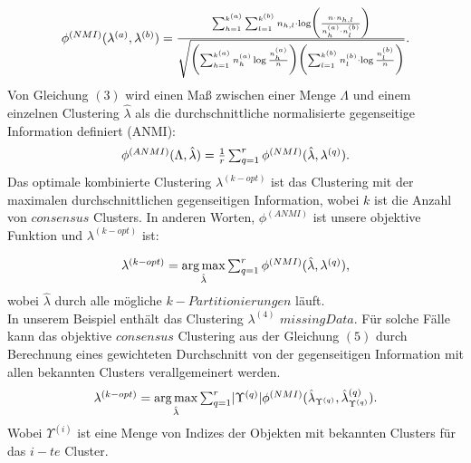 \documentclass[runningheads]{llncs}
\begin{document}
\begin{equation}
\centerline{$\phi^{(NMI)}(\lambda^{(a)}, \lambda^{(b)}) = \frac{\sum_{h=1}^{k^{(a)}} \sum_{l=1}^{k^{(b)}}n_{h,l} \cdot \log \biggl(\frac{n \cdot n_{h,l}}{n_{h}^{(a)} \cdot n_{l}^{(b)}} \biggr) }{\sqrt{\biggl(\sum_{h=1}^{k^{(a)}} n_{h}^{(a)} \log \frac{n_{h}^{(a)}}{n} \biggr)
			\biggl(\sum_{l=1}^{k^{(b)}} n_{l}^{(b)} \cdot \log \frac{n_{l}^{(b)}}{n} \biggr)}}.$}
\end{equation}
Von Gleichung $(3)$ wird einen Maß zwischen einer Menge $\Lambda$ und einem einzelnen Clustering $\hat{\lambda}$  als die durchschnittliche normalisierte gegenseitige Information definiert (ANMI): 
\begin{equation} 
	\centerline{$\phi^{(ANMI)}(\Lambda, \hat{\lambda}) = \frac{1}{r} \sum_{q=1}^{r} \phi^{(NMI)}(\hat{\lambda}, \lambda^{(q)}).$}
\end{equation}
Das optimale kombinierte Clustering $\lambda^{(k-opt)}$ ist das Clustering mit der maximalen durchschnittlichen gegenseitigen Information, wobei $k$ ist die Anzahl von $consensus$ Clusters. In anderen Worten, $\phi^{(ANMI)}$ ist unsere objektive Funktion und $\lambda^{(k-opt)}$ ist:

\begin{equation} 
	\centerline{$\lambda^{(k-opt)} = \underset{\hat{\lambda}}{\arg\max} \sum_{q=1}^{r} \phi^{(NMI)}(\hat{\lambda}, \lambda^{(q)}),$}
\end{equation}
wobei $\hat{\lambda}$ durch alle mögliche $k-Partitionierungen$ läuft. \\  
In unserem Beispiel enthält das Clustering $\lambda^{(4)}$ $missing Data$. Für solche Fälle kann das objektive $consensus$ Clustering aus der Gleichung $(5)$ durch Berechnung eines gewichteten Durchschnitt von der gegenseitigen Information mit allen bekannten Clusters verallgemeinert werden.   
\begin{equation} 
	\centerline{$\lambda^{(k-opt)} = \underset{\hat{\lambda}}{\arg\max} \sum_{q=1}^{r} \lvert \Upsilon^{(q)} \lvert \phi^{(NMI)}(\hat{\lambda}_{\Upsilon^{(q)}}, \hat{\lambda}_{\Upsilon^{(q)}}^{(q)}).$}
\end{equation}
Wobei $\Upsilon^{(i)}$ ist eine Menge von Indizes der Objekten mit bekannten Clusters für das $i-te$ Cluster. 
\end{document}
